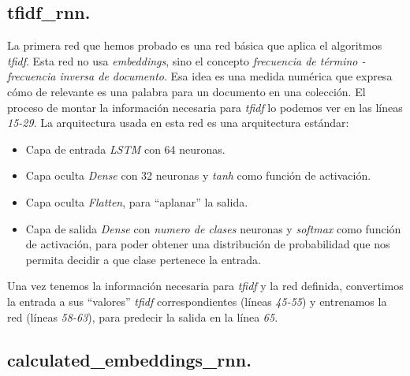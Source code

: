 \documentclass[11pt]{article}
\begin{document}
\subsection{tfidf\_rnn.} \label{tfidfrnn}

La primera red que hemos probado es una red básica que aplica el algoritmos \textit{tfidf}. Esta red no usa \textit{embeddings}, sino el concepto \textit{frecuencia de término - frecuencia inversa de documento}. Esa idea es una medida numérica que expresa cómo de relevante es una palabra para un documento en una colección. El proceso de montar la información necesaria para \textit{tfidf} lo podemos ver en las líneas \textit{15-29}. La arquitectura usada en esta red es una arquitectura estándar: 

\begin{itemize}
    \item Capa de entrada \textit{LSTM} con 64 neuronas.
    \item Capa oculta \textit{Dense} con 32 neuronas y \textit{tanh} como función de activación.
    \item Capa oculta \textit{Flatten}, para ``aplanar'' la salida.
    \item Capa de salida \textit{Dense} con \textit{numero de clases} neuronas y \textit{softmax} como función de activación, para poder obtener una distribución de probabilidad que nos permita decidir a que clase pertenece la entrada.
\end{itemize}

Una vez tenemos la información necesaria para \textit{tfidf} y la red definida, convertimos la entrada a sus ``valores'' \textit{tfidf} correspondientes (líneas \textit{45-55}) y entrenamos la red (líneas \textit{58-63}), para predecir la salida en la línea \textit{65}.



\subsection{calculated\_embeddings\_rnn.} \label{calculatedembeddingsrnn}
\end{document}
